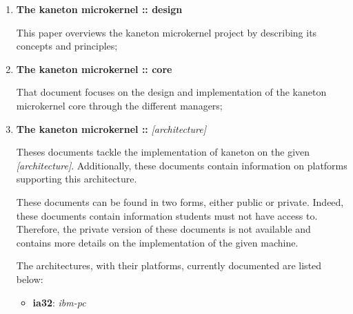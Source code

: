 \begin{enumerate}
  \item
    \textbf{The kaneton microkernel :: design}

    \-

    This paper overviews the kaneton microkernel project by describing its
    concepts and principles;
  \item
    \textbf{The kaneton microkernel :: core}

    \-

    That document focuses on the design and implementation of the kaneton
    microkernel core through the different managers;
  \item
    \textbf{The kaneton microkernel :: }\textit{[architecture]}

    \-

    Theses documents tackle the implementation of kaneton on the given
    \textit{[architecture]}. Additionally, these documents contain information
    on platforms supporting this architecture.

    \-

    These documents can be found in two forms, either public or private.
    Indeed, these documents contain information students must not have
    access to. Therefore, the private version of these documents is not
    available and contains more details on the implementation of the given
    machine.

    \-

    The architectures, with their platforms, currently documented are
    listed below:

    \begin{itemize}
      \item
	\textbf{ia32}: \textit{ibm-pc}
    \end{itemize}
\end{enumerate}
